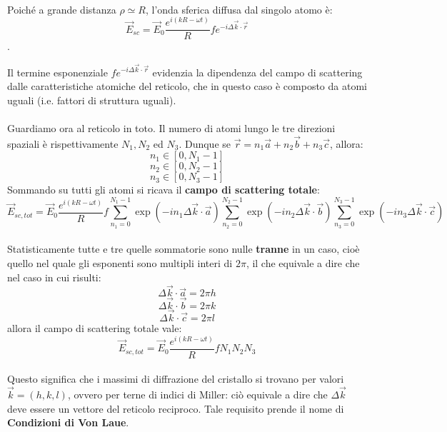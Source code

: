\documentclass{book}
\begin{document}
                \paragraph{}
                    Poiché a grande distanza $\rho \simeq R$, l'onda sferica diffusa dal singolo atomo è:
                    $$\vec{E}_{sc} = \vec{E}_{0} \frac{e^{i(kR - \omega t)}}{R} f e^{-i \Delta \vec{k} \cdot \vec{r}}$$.

                    Il termine esponenziale $fe^{-i\Delta \vec{k} \cdot \vec{r}}$ evidenzia la dipendenza del campo di scattering dalle caratteristiche atomiche del reticolo, che in questo caso è composto da atomi uguali (i.e. fattori di struttura uguali).
                \paragraph{}
                    Guardiamo ora al reticolo in toto. Il numero di atomi lungo le tre direzioni spaziali è rispettivamente $N_{1}, N_{2}$ ed $N_{3}$.
                    Dunque se $\vec{r} = n_{1}\vec{a}+n_{2}\vec{b}+n_{3}\vec{c}$, allora:
                    $$n_{1} \in [0, N_{1}-1]$$
                    $$n_{2} \in [0, N_{2}-1]$$
                    $$n_{3} \in [0, N_{3}-1]$$
                    Sommando su tutti gli atomi si ricava il \textbf{campo di scattering totale}:
                    $$\vec{E}_{sc, tot} = \vec{E}_{0} \frac{e^{i(kR-\omega t)}}{R} f \sum_{n_{1} = 0} ^{N_{1} -1}\exp{(-in_{1}\Delta\vec{k} \cdot \vec{a})}\sum_{n_{2} = 0} ^{N_{2} -1}\exp{(-in_{2}\Delta\vec{k} \cdot \vec{b})}\sum_{n_{3} = 0} ^{N_{3} -1}\exp{(-in_{3}\Delta\vec{k} \cdot \vec{c})}$$
                \newpage
                \paragraph{}
                    Statisticamente tutte e tre quelle sommatorie sono nulle \textbf{tranne} in un caso, cioè quello nel quale gli esponenti sono multipli interi di $2\pi$, il che equivale a dire che nel caso in cui risulti:
                    $$\Delta \vec{k} \cdot \vec{a} = 2 \pi h$$
                    $$\Delta \vec{k} \cdot \vec{b} = 2 \pi k$$
                    $$\Delta \vec{k} \cdot \vec{c} = 2 \pi l$$
                    allora il campo di scattering totale vale:
                    $$\vec{E}_{sc, tot} = \vec{E}_{0}\frac{e^{i(kR - \omega t)}}{R} f N_{1}N_{2}N_{3}$$

                    \paragraph{}
                    Questo significa che i massimi di diffrazione del cristallo si trovano per valori $\vec{k} = (h, k, l)$,  ovvero per terne di indici di Miller: ciò equivale a dire che $\Delta \vec{k}$ deve essere un vettore del reticolo reciproco. Tale requisito prende il nome di \textbf{Condizioni di Von Laue}.
\end{document}
